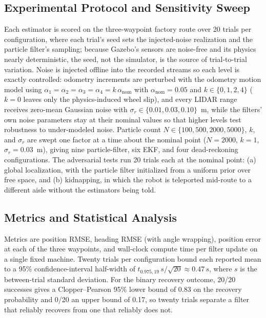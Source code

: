 \documentclass[conf]{new-aiaa}
\begin{document}
\subsection{Experimental Protocol and Sensitivity Sweep}\label{sec:Protocol}
Each estimator is scored on the three-waypoint factory route over 20 trials per configuration, where each trial's seed sets the injected-noise realization and the particle filter's sampling; because Gazebo's sensors are noise-free and its physics nearly deterministic, the seed, not the simulator, is the source of trial-to-trial variation. Noise is injected offline into the recorded streams so each level is exactly controlled: odometry increments are perturbed with the odometry motion model using $\alpha_1 = \alpha_2 = \alpha_3 = \alpha_4 = k\,\alpha_{\text{nom}}$ with $\alpha_{\text{nom}} = 0.05$ and $k \in \{0, 1, 2, 4\}$ ($k = 0$ leaves only the physics-induced wheel slip), and every LIDAR range receives zero-mean Gaussian noise with $\sigma_r \in \{0.01, 0.03, 0.10\}$~m, while the filters' own noise parameters stay at their nominal values so that higher levels test robustness to under-modeled noise. Particle count $N \in \{100, 500, 2000, 5000\}$, $k$, and $\sigma_r$ are swept one factor at a time about the nominal point ($N = 2000$, $k = 1$, $\sigma_r = 0.03$~m), giving nine particle-filter, six EKF, and four dead-reckoning configurations. The adversarial tests run 20 trials each at the nominal point: (a) global localization, with the particle filter initialized from a uniform prior over free space, and (b) kidnapping, in which the robot is teleported mid-route to a different aisle without the estimators being told.

\subsection{Metrics and Statistical Analysis}\label{sec:Statistics}
Metrics are position RMSE, heading RMSE (with angle wrapping), position error at each of the three waypoints, and wall-clock compute time per filter update on a single fixed machine. Twenty trials per configuration bound each reported mean to a 95\% confidence-interval half-width of $t_{0.975,19}\,s/\sqrt{20} \approx 0.47\,s$, where $s$ is the between-trial standard deviation. For the binary recovery outcome, 20/20 successes gives a Clopper--Pearson 95\% lower bound of 0.83 on the recovery probability and 0/20 an upper bound of 0.17, so twenty trials separate a filter that reliably recovers from one that reliably does not.
\end{document}

